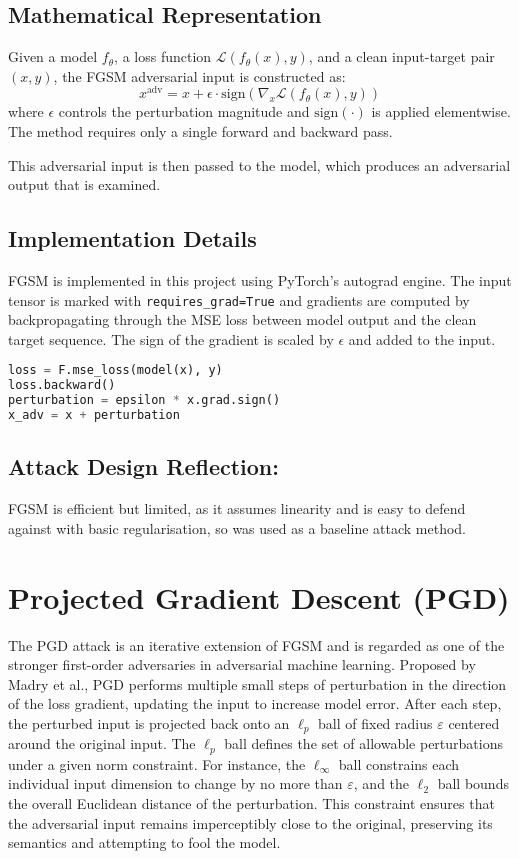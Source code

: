 \subsection*{Mathematical Representation}
Given a model $f_\theta$, a loss function $\mathcal{L}(f_\theta(x), y)$, and a clean input-target pair $(x, y)$, the FGSM adversarial input is constructed as:
\[
x^{\text{adv}} = x + \epsilon \cdot \text{sign} \left( \nabla_x \mathcal{L}(f_\theta(x), y) \right)
\]
where $\epsilon$ controls the perturbation magnitude and $\text{sign}(\cdot)$ is applied elementwise. The method requires only a single forward and backward pass.

This adversarial input is then passed to the model, which produces an adversarial output that is examined.

\subsection*{Implementation Details}
FGSM is implemented in this project using PyTorch's autograd engine. The input tensor is marked with \texttt{requires\_grad=True} and gradients are computed by backpropagating through the MSE loss between model output and the clean target sequence. The sign of the gradient is scaled by $\epsilon$ and added to the input.

\begin{lstlisting}[language=Python, caption={FGSM adversarial attack implementation}]
loss = F.mse_loss(model(x), y)
loss.backward()
perturbation = epsilon * x.grad.sign()
x_adv = x + perturbation
\end{lstlisting}

\subsection*{Attack Design Reflection:}  
FGSM is efficient but limited, as it assumes linearity and is easy to defend against with basic regularisation, so was used as a baseline attack method.

\section{Projected Gradient Descent (PGD)}

The PGD attack is an iterative extension of FGSM and is regarded as one of the stronger first-order adversaries in adversarial machine learning. Proposed by Madry et al., PGD performs multiple small steps of perturbation in the direction of the loss gradient, updating the input to increase model error. After each step, the perturbed input is projected back onto an $\ell_p$ ball of fixed radius $\varepsilon$ centered around the original input. The $\ell_p$ ball defines the set of allowable perturbations under a given norm constraint. For instance, the $\ell_\infty$ ball constrains each individual input dimension to change by no more than $\varepsilon$, and the $\ell_2$ ball bounds the overall Euclidean distance of the perturbation. This constraint ensures that the adversarial input remains imperceptibly close to the original, preserving its semantics and attempting to fool the model.

